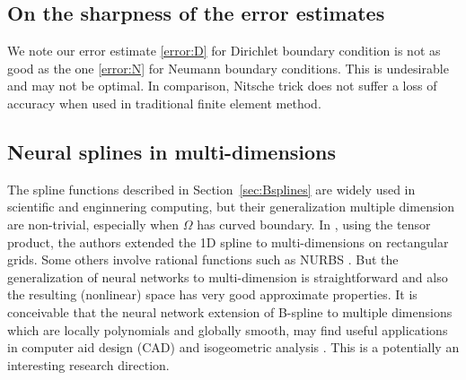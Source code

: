 \subsection{On the sharpness of the error estimates} 

We  note our error estimate \eqref{error:D} for Dirichlet boundary
condition is not as good as the one \eqref{error:N} for Neumann
boundary conditions.  This is undesirable and may not be optimal.  In
comparison, Nitsche trick does not suffer a loss of accuracy when used
in traditional finite element method.

\subsection{Neural splines in multi-dimensions}
The spline functions described in Section~\ref{sec:Bsplines} are widely
used in scientific and enginnering computing, but their generalization
multiple dimension are non-trivial, especially when $\Omega$ has
curved boundary. In \cite{hu2015minimal}, using the tensor product,
the authors extended the 1D spline to multi-dimensions on rectangular
grids.  Some others involve rational functions such as NURBS
\cite{cottrell2009isogeometric}. But the generalization of neural networks to multi-dimension is straightforward and also the
resulting (nonlinear) space has very good approximate properties.  It
is conceivable that the neural network extension of B-spline to
multiple dimensions which are locally polynomials and globally smooth,
may find useful applications in computer aid design (CAD) and
isogeometric analysis \cite{cottrell2009isogeometric}. This is a
potentially an interesting research direction.




